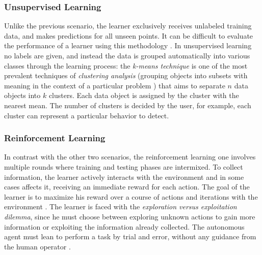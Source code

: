 
\subsubsection{Unsupervised Learning}
\label{subsubsec:unsupervised-learning}

Unlike the previous scenario, the learner exclusively receives unlabeled training data, and makes predictions for all unseen points. It can be difficult to evaluate the performance of a learner using this methodology \cite[p. 6]{Mohri2018}. In unsupervised learning no labels are given, and instead the data is grouped automatically into various classes through the learning process: the \textit{k-means technique} is one of the most prevalent techniques of \textit{clustering analysis} (grouping objects into subsets with meaning in the context of a particular problem \cite{Annachhatre2015}) that aims to separate $n$ data objects into $k$ clusters. Each data object is assigned by the cluster with the nearest mean. The number of clusters is decided by the user, for example, each cluster can represent a particular behavior to detect.


\subsubsection{Reinforcement Learning}
\label{subsubsec:reinforcement-learning}

In contrast with the other two scenarios, the reinforcement learning one involves multiple rounds where training and testing phases are intermixed. To collect information, the learner actively interacts with the environment and in some cases affects it, receiving an immediate reward for each action. The goal of the learner is to maximize his reward over a course of actions and iterations with the environment \cite[p. 7]{Mohri2018}. The learner is faced with the \textit{exploration versus exploitation dilemma}, since he must choose between exploring unknown actions to gain more information or exploiting the information already collected. The autonomous agent must lean to perform a task by trial and error, without any guidance from the human operator \cite[p. 25]{Goodfellow2016}.

